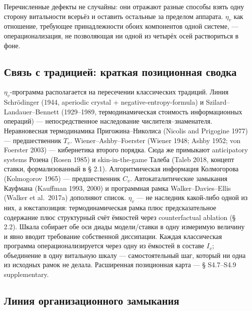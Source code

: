 \documentclass[pdflatex,sn-mathphys-ay]{sn-jnl}
\begin{document}
Перечисленные дефекты не случайны: они отражают разные способы взять одну сторону витальности всерьёз и оставить остальные за пределом аппарата. \(\eta_v\) как отношение, требующее принадлежности обоих компонентов одной системе, --- операционализация, не позволяющая ни одной из четырёх осей раствориться в фоне.

\subsection{Связь с традицией: краткая позиционная сводка}\label{ux441ux432ux44fux437ux44c-ux441-ux442ux440ux430ux434ux438ux446ux438ux435ux439-ux43aux440ux430ux442ux43aux430ux44f-ux43fux43eux437ux438ux446ux438ux43eux43dux43dux430ux44f-ux441ux432ux43eux434ux43aux430}

\(\eta_v\)-программа располагается на пересечении классических традиций. Линия Schrödinger (1944, aperiodic crystal + negative-entropy-formula) и Szilard--Landauer--Bennett (1929--1989, термодинамическая стоимость информационных операций) --- непосредственное наследование числителя--знаменателя. Неравновесная термодинамика Пригожина--Николиса (Nicolis and Prigogine 1977) --- предшественник \(T_v\). Wiener--Ashby--Foerster (Wiener 1948; Ashby 1952; von Foerster 2003) --- кибернетика второго порядка. Сюда же примыкают anticipatory systems Розена (Rosen 1985) и skin-in-the-game Талеба (Taleb 2018, концепт ставки, формализованный в § 2.1). Алгоритмическая информация Колмогорова (Kolmogorov 1965) --- предшественник \(C_v\). Автокаталитические замыкания Кауфмана (Kauffman 1993, 2000) и программная рамка Walker--Davies--Ellis (Walker et al.~2017a) дополняют список. \(\eta_v\) --- не наследник какой-либо одной из них, а юкстапозиция: термодинамическая рамка плюс предсказательное содержание плюс структурный счёт ёмкостей через counterfactual ablation (§ 2.2). Шкала собирает обе оси диады модели/ставки в одну измеримую величину и явно вводит требование собственной диссипации. Каждая классическая программа операционализируется через одну из ёмкостей в составе \(I_v\); объединение в одну витальную шкалу --- самостоятельный шаг, который ни одна из исходных рамок не делала. Расширенная позиционная карта --- § S4.7--S4.9 supplementary.

\subsection{Линия организационного замыкания}\label{ux43bux438ux43dux438ux44f-ux43eux440ux433ux430ux43dux438ux437ux430ux446ux438ux43eux43dux43dux43eux433ux43e-ux437ux430ux43cux44bux43aux430ux43dux438ux44f}
\end{document}
